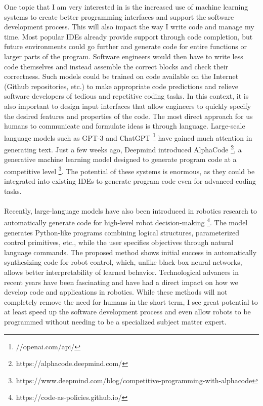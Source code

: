 \documentclass[11pt]{article}
\begin{document}
One topic that I am very interested in is the increased use of machine learning systems to create better programming interfaces and support the software development process. This will also impact the way I write code and manage my time. Most popular IDEs already provide support through code completion, but future environments could go further and generate code for entire functions or larger parts of the program. Software engineers would then have to write less code themselves and instead assemble the correct blocks and check their correctness. Such models could be trained on code available on the Internet (Github repositories, etc.) to make appropriate code predictions and relieve software developers of tedious and repetitive coding tasks. In this context, it is also important to design input interfaces that allow engineers to quickly specify the desired features and properties of the code. The most direct approach for us humans to communicate and formulate ideas is through language. Large-scale language models such as GPT-3 and ChatGPT \footnote{//openai.com/api/} have gained much attention in generating text. Just a few weeks ago, Deepmind introduced AlphaCode \footnote{https://alphacode.deepmind.com/}, a generative machine learning model designed to generate program code at a competitive level \footnote{https://www.deepmind.com/blog/competitive-programming-with-alphacode}. The potential of these systems is enormous, as they could be integrated into existing IDEs to generate program code even for advanced coding tasks.\\
\\
Recently, large-language models have also been introduced in robotics research to automatically generate code for high-level robot decision-making \footnote{https://code-as-policies.github.io/}. The model generates Python-like programs combining logical structures, parameterized control primitives, etc.,  while the user specifies objectives through natural language commands. The proposed method shows initial success in automatically synthesizing code for robot control, which, unlike black-box neural networks, allows better interpretability of learned behavior. Technological advances in recent years have been fascinating and have had a direct impact on how we develop code and applications in robotics. While these methods will not completely remove the need for humans in the short term, I see great potential to at least speed up the software development process and even allow robots to be programmed without needing to be a specialized subject matter expert.
\end{document}
